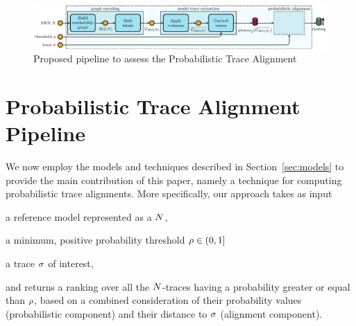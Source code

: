\begin{figure}[!t]
	\hspace*{-1cm}\includegraphics[width=1.2\textwidth]{images/pipeline}
	\caption{Proposed pipeline to assess the Probabilistic Trace Alignment}\label{fig:pipe}
\end{figure}


\section{Probabilistic Trace Alignment Pipeline}
We now employ the models and techniques described in Section~\ref{sec:models} to provide the main contribution of this paper, namely a technique for computing probabilistic trace alignments. More specifically, our approach takes as input 
\begin{inparaenum}[\it (i)]
\item a reference model represented as a \uswn $N$,
\item a minimum, positive probability threshold $\rho \in (0,1]$
\item a trace $\sigma$ of interest,  
\end{inparaenum}
and returns a ranking over all the $N$-traces having a probability greater or equal than $\rho$, based on a combined consideration of their probability values (probabilistic component) and their distance to $\sigma$ (alignment component).

